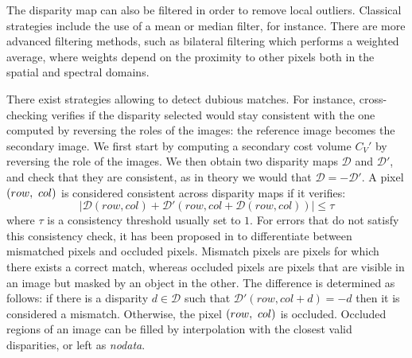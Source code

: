 The disparity map can also be filtered in order to remove local outliers. Classical strategies include the use of a mean or median filter, for instance. There are more advanced filtering methods, such as bilateral filtering \cite{tomasi_bilateral_1998} which performs a weighted average, where weights depend on the proximity to other pixels both in the spatial and spectral domains.

There exist strategies allowing to detect dubious matches. For instance, cross-checking \cite{fua_combining_1991} verifies if the disparity selected would stay consistent with the one computed by reversing the roles of the images: the reference image becomes the secondary image. We first start by computing a secondary cost volume $C_V'$ by reversing the role of the images. We then obtain two disparity maps $\mathcal{D}$ and $\mathcal{D}'$, and check that they are consistent, as in theory we would that $\mathcal{D}=-\mathcal{D}'$. A pixel $(row, ~col)$ is considered consistent across disparity maps if it verifies:
\begin{equation}\label{eq:cross-checking}
    |\mathcal{D}(row, col) + \mathcal{D}'(row, col+\mathcal{D}(row, col))|\leqslant \tau
\end{equation}
where $\tau$ is a consistency threshold usually set to $1$. For errors that do not satisfy this consistency check, it has been proposed in \cite{hirschmuller_stereo_2008} to differentiate between mismatched pixels and occluded pixels. Mismatch pixels are pixels for which there exists a correct match, whereas occluded pixels are pixels that are visible in an image but masked by an object in the other. The difference is determined as follows: if there is a disparity $d\in\mathcal{D}$ such that $\mathcal{D}'(row, col+d)=-d$ then it is considered a mismatch. Otherwise, the pixel $(row, ~col)$ is occluded. Occluded regions of an image can be filled by interpolation with the closest valid disparities, or left as \textit{nodata}.  

